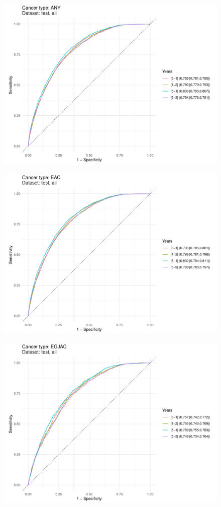 \documentclass[english]{article}
\begin{document}
\begin{figure}[ht]
\includegraphics[width=1.0\linewidth]{cancerstage/2y_ANY_all.pdf}
\end{figure}


\begin{figure}[ht]
\includegraphics[width=1.0\linewidth]{cancerstage/2y_EAC_all.pdf}
\end{figure}


\begin{figure}[ht]
\includegraphics[width=1.0\linewidth]{cancerstage/2y_EGJAC_all.pdf}
\end{figure}
\end{document}

